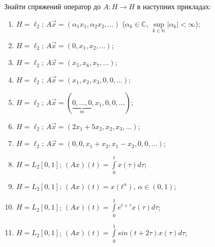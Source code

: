 \begin{exercise}
    Знайти спряжений оператор до $A: H\rightarrow H$ в наступних 
    прикладах:
    \begin{enumerate}[label=\ukr*)]
        \item $H = \ell_2$; $A\vec{x} = (\alpha_1x_1, \alpha_2x_2, ...)$
        ($\alpha_k \in \mathbb{C}$, $\underset{k \in \mathbb{N}}{\sup}|\alpha_k| < \infty$);
        \item $H = \ell_2$; $A\vec{x} = (0, x_1, x_2, ...)$;
        \item $H = \ell_2$; $A\vec{x} = (x_5, x_6, x_7, ...)$;
        \item $H = \ell_2$; $A\vec{x} = (x_1, x_2, x_3,0,0,...)$;
        \item $H = \ell_2$; $A\vec{x} = (\underbrace{0,...,0}_m, 
        x_1, 0, 0, ...)$;
        \item $H = \ell_2$; $A\vec{x} = (2x_1 + 5x_2, x_2, x_3, ...)$;
        \item $H = \ell_2$; $A\vec{x} = (0, 0, x_1 + x_2, x_1 - x_2, 0,  
        0, ...)$;
        \item $H = L_2[0,1]$; $(Ax)(t) = \int\limits_0^t x(\tau) d\tau$;
        \item $H = L_2[0,1]$; $(Ax)(t) = x(t^\alpha)$, $\alpha \in (0,1)$;
        \item $H = L_2[0,1]$; $(Ax)(t) = \int\limits_0^1 e^{t+\tau}x(\tau) 
        d\tau$;
        \item $H = L_2[0,1]$; $(Ax)(t) = \int\limits_0^1 
        sin(t+2\tau) x(\tau) d\tau$;
    \end{enumerate}
\end{exercise}